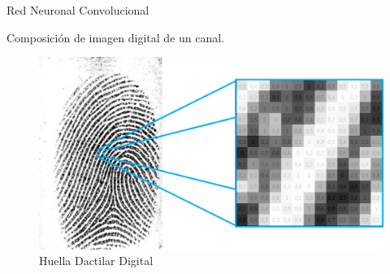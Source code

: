 \documentclass[12pt,aspectratio=169]{beamer}
\begin{document}
\begin{frame}{Red Neuronal Convolucional}

    Composición de imagen digital de un canal.

    \begin{figure}
        \includegraphics[scale=0.45]{figs/huella_pixeles_numeros.png}
        \caption{Huella Dactilar Digital}
    \end{figure}

\end{frame}
\end{document}
